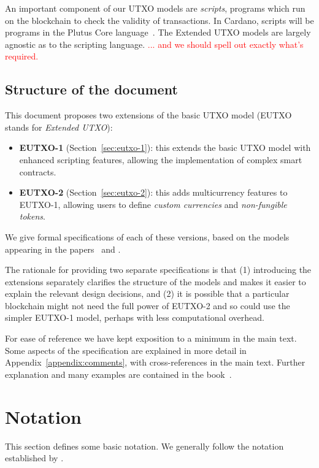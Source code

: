 \documentclass[a4paper]{article}
\newcommand{\red}[1]{\textcolor{red}{#1}}
\begin{document}
An important component of our UTXO models are \textit{scripts},
programs which run on the blockchain to check the validity of
transactions.  In Cardano, scripts will be programs in the Plutus Core
language~\citep{Plutus-Core-spec}. The Extended UTXO models are largely
agnostic as to the scripting language. \red{... and we should spell
  out exactly what's required.}


\subsection{Structure of the document}
\label{sec:doc-structure}
This document proposes two extensions of the basic UTXO model (EUTXO
stands for \textit{Extended UTXO}):

\begin{itemize}
  \item \textbf{EUTXO-1} (Section~\ref{sec:eutxo-1}): this extends the
    basic UTXO model with enhanced scripting features, allowing the
    implementation of complex smart contracts.
  \item \textbf{EUTXO-2} (Section~\ref{sec:eutxo-2}): this adds
    multicurrency features to EUTXO-1, allowing users to define
    \textit{custom currencies} and \textit{non-fungible tokens}.
\end{itemize}

\noindent We give formal specifications of each of these versions,
based on the models appearing in the
papers~\citep{Zahnentferner18-Chimeric} and
\citep{Zahnentferner18-UTxO}.

\medskip

The rationale for providing two separate specifications is that (1)
introducing the extensions separately clarifies the structure of the
models and makes it easier to explain the relevant design decisions,
and (2) it is possible that a particular blockchain might not need the
full power of EUTXO-2 and so could use the simpler EUTXO-1 model,
perhaps with less computational overhead.

\medskip

For ease of reference we have kept exposition to a minimum in the main
text.  Some aspects of the specification are explained in more detail
in Appendix~\ref{appendix:comments}, with cross-references in the main
text.  Further explanation and many examples are contained in the
book~\citep{Plutus-book}.



\newpage
\section{Notation}
This section defines some basic notation.  We generally follow the
notation established by \citep{Zahnentferner18-UTxO}.
\end{document}
